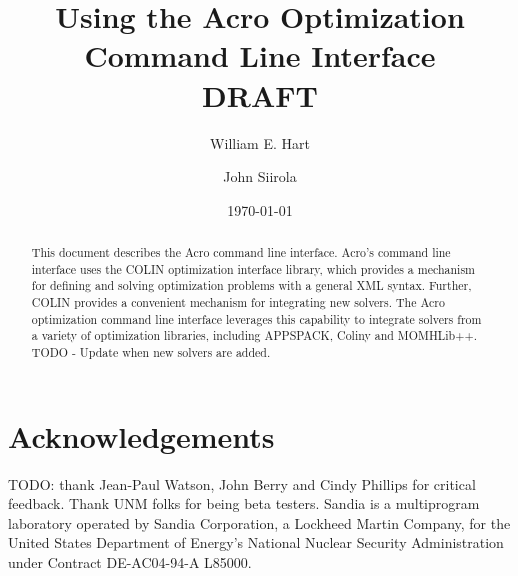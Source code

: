 \documentclass{article}
\begin{document}
\lstset{aboveskip=1em,belowskip=1em}

\title{Using the Acro Optimization Command Line Interface\\
DRAFT}

\author{
William E. Hart \and John Siirola}

\date{\today}

\maketitle

\begin{abstract}
This document describes the Acro command line interface.  Acro's command line interface uses the COLIN optimization interface library, which provides a mechanism for defining and solving optimization problems with a general XML syntax. Further, COLIN provides a convenient mechanism for integrating new solvers.  The Acro optimization command line interface leverages this capability to integrate solvers from a variety of optimization libraries, including APPSPACK, Coliny and MOMHLib++.
\if
TODO - Update when new solvers are added.
\fi
\end{abstract}

\pagestyle{plain}





%
%
%
%


\section*{Acknowledgements}

TODO: thank Jean-Paul Watson, John Berry and Cindy Phillips for critical feedback.  Thank UNM folks for being beta testers.
\fi
Sandia is a multiprogram laboratory operated by Sandia Corporation, a Lockheed Martin Company, for the United States Department of Energy's National Nuclear Security Administration under Contract DE-AC04-94-A
L85000.



\end{document}
